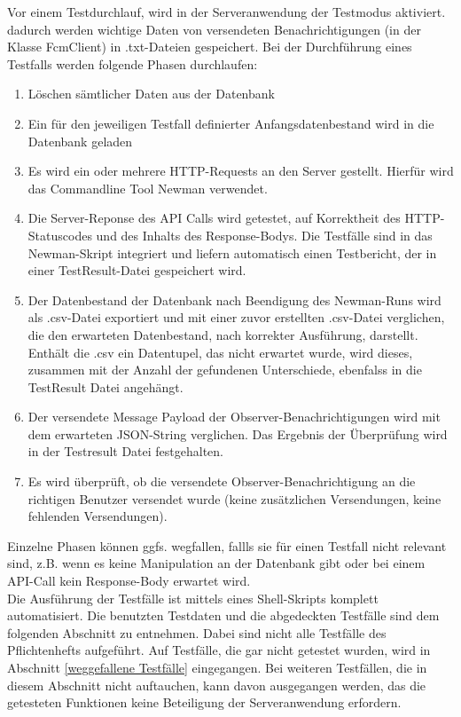 \documentclass[11pt,a4paper]{scrartcl}
\begin{document}
Vor einem Testdurchlauf, wird in der Serveranwendung der Testmodus aktiviert. dadurch werden wichtige Daten von versendeten Benachrichtigungen (in der Klasse FcmClient) in .txt-Dateien gespeichert.
Bei der Durchführung eines Testfalls werden folgende Phasen durchlaufen:
\begin{enumerate}
	\item Löschen sämtlicher Daten aus der Datenbank
	\item Ein für den jeweiligen Testfall definierter Anfangsdatenbestand wird in die Datenbank geladen
	\item Es wird ein oder mehrere HTTP-Requests an den Server gestellt. Hierfür wird das Commandline Tool Newman verwendet.
	\item Die Server-Reponse des API Calls wird getestet, auf Korrektheit des HTTP-Statuscodes und des Inhalts des Response-Bodys. Die Testfälle sind in das Newman-Skript integriert und liefern automatisch einen Testbericht, der in einer TestResult-Datei gespeichert wird.
	\item Der Datenbestand der Datenbank nach Beendigung des Newman-Runs wird als .csv-Datei exportiert und mit einer zuvor erstellten .csv-Datei verglichen, die den erwarteten Datenbestand, nach korrekter Ausführung, darstellt. Enthält die .csv ein Datentupel, das nicht erwartet wurde,  wird dieses, zusammen mit der Anzahl der gefundenen Unterschiede, ebenfalss in die TestResult Datei angehängt.
	\item Der versendete Message Payload der Observer-Benachrichtigungen wird mit dem erwarteten JSON-String verglichen. Das Ergebnis der Überprüfung wird in der Testresult Datei festgehalten.
	\item Es wird überprüft, ob die versendete Observer-Benachrichtigung an die richtigen Benutzer versendet wurde (keine zusätzlichen Versendungen, keine fehlenden Versendungen).
\end{enumerate}
Einzelne Phasen können ggfs. wegfallen, fallls sie für einen Testfall nicht relevant sind, z.B. wenn es keine Manipulation an der Datenbank gibt oder bei einem API-Call kein Response-Body erwartet wird.\\

Die Ausführung der Testfälle ist mittels eines Shell-Skripts komplett automatisiert. Die benutzten Testdaten und die abgedeckten Testfälle sind dem folgenden Abschnitt zu entnehmen. Dabei sind nicht alle Testfälle des Pflichtenhefts aufgeführt. Auf Testfälle, die gar nicht getestet wurden, wird in Abschnitt \ref{weggefallene Testfälle} eingegangen. Bei weiteren Testfällen, die in diesem Abschnitt nicht auftauchen, kann davon ausgegangen werden, das die getesteten Funktionen keine Beteiligung der Serveranwendung erfordern.\\
\end{document}
